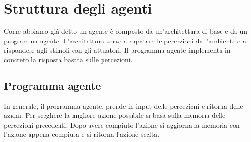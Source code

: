 \section{Struttura degli agenti}
Come abbiamo gi\`a detto un agente \`e composto da un'architettura di base e da un programma
agente. L'architettura serve a capatare le percezioni dall'ambiente e a rispondere agli
stimoli con gli attuatori. Il programma agente implementa in concreto la risposta basata
sulle percezioni.

\subsection{Programma agente}
In generale, il programma agente, prende in input delle percezioni e ritorna delle azioni.
Per scegliere la migliore azione possibile si basa sulla memoria delle percezioni precedenti.
Dopo avere compiuto l'azione si aggiorna la memoria con l'azione appena compiuta e si ritorna
l'azione scelta.